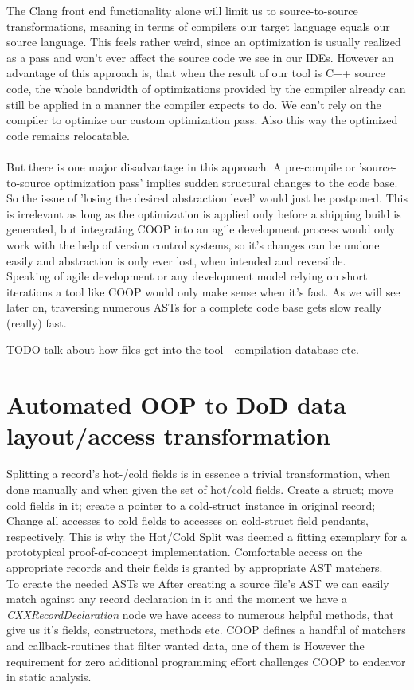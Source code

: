 The Clang front end functionality alone will limit us to source-to-source transformations, meaning in terms of compilers our target language equals our source language. This feels rather weird, since an optimization is usually realized as a pass and won't ever affect the source code we see in our IDEs. However an advantage of this approach is, that when the result of our tool is C++ source code, the whole bandwidth of optimizations provided by the compiler already can still be applied in a manner the compiler expects to do. We can't rely on the compiler to optimize our custom optimization pass. Also this way the optimized code remains relocatable.\\\\
But there is one major disadvantage in this approach. A pre-compile or 'source-to-source optimization pass' implies sudden structural changes to the code base. So the issue of 'losing the desired abstraction level' would just be postponed. This is irrelevant as long as the optimization is applied only before a shipping build is generated, but integrating COOP into an agile development process would only work with the help of version control systems, so it's changes can be undone easily and abstraction is only ever lost, when intended and reversible.\\
Speaking of agile development or any development model relying on short iterations a tool like COOP would only make sense when it's fast. As we will see later on, traversing numerous ASTs for a complete code base gets slow really (really) fast.

TODO talk about how files get into the tool - compilation database etc.

\section{Automated OOP to DoD data layout/access transformation}
Splitting a record's hot-/cold fields is in essence a trivial transformation, when done manually and when given the set of hot/cold fields. Create a struct; move cold fields in it; create a pointer to a cold-struct instance in original record; Change all accesses to cold fields to accesses on cold-struct field pendants, respectively. This is why the Hot/Cold Split was deemed a fitting exemplary for a prototypical proof-of-concept implementation. Comfortable access on the appropriate records and their fields is granted by appropriate AST matchers.\\
To create the needed ASTs we
After creating a source file's AST we can easily match against any record declaration in it and the moment we have a \textit{CXXRecordDeclaration} node we have access to numerous helpful methods, that give us it's fields, constructors, methods etc. COOP defines a handful of matchers and callback-routines that filter wanted data, one of them is 
However the requirement for zero additional programming effort challenges COOP to endeavor in static analysis.